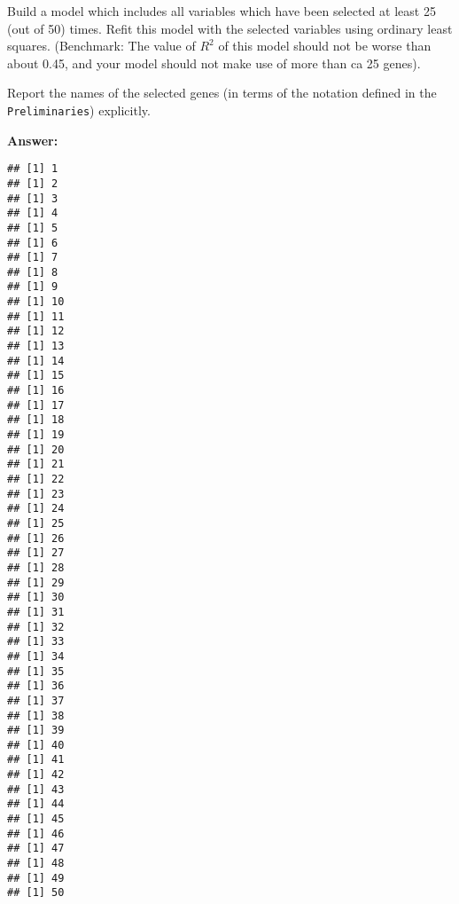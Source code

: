 \documentclass[
]{article}
\newenvironment{Shaded}{\begin{snugshade}}{\end{snugshade}}
\newcommand{\AttributeTok}[1]{\textcolor[rgb]{0.77,0.63,0.00}{#1}}
\newcommand{\CommentTok}[1]{\textcolor[rgb]{0.56,0.35,0.01}{\textit{#1}}}
\newcommand{\ControlFlowTok}[1]{\textcolor[rgb]{0.13,0.29,0.53}{\textbf{#1}}}
\newcommand{\DecValTok}[1]{\textcolor[rgb]{0.00,0.00,0.81}{#1}}
\newcommand{\FunctionTok}[1]{\textcolor[rgb]{0.00,0.00,0.00}{#1}}
\newcommand{\NormalTok}[1]{#1}
\newcommand{\OtherTok}[1]{\textcolor[rgb]{0.56,0.35,0.01}{#1}}
\newcommand{\SpecialCharTok}[1]{\textcolor[rgb]{0.00,0.00,0.00}{#1}}
\newcommand{\StringTok}[1]{\textcolor[rgb]{0.31,0.60,0.02}{#1}}
\begin{document}
Build a model which includes all variables which have been selected at
least 25 (out of 50) times. Refit this model with the selected variables
using ordinary least squares. (Benchmark: The value of \(R^2\) of this
model should not be worse than about 0.45, and your model should not
make use of more than ca 25 genes).

Report the names of the selected genes (in terms of the notation defined
in the \texttt{Preliminaries}) explicitly.

\textbf{Answer:}

\begin{Shaded}
\end{Shaded}

\begin{verbatim}
## [1] 1
## [1] 2
## [1] 3
## [1] 4
## [1] 5
## [1] 6
## [1] 7
## [1] 8
## [1] 9
## [1] 10
## [1] 11
## [1] 12
## [1] 13
## [1] 14
## [1] 15
## [1] 16
## [1] 17
## [1] 18
## [1] 19
## [1] 20
## [1] 21
## [1] 22
## [1] 23
## [1] 24
## [1] 25
## [1] 26
## [1] 27
## [1] 28
## [1] 29
## [1] 30
## [1] 31
## [1] 32
## [1] 33
## [1] 34
## [1] 35
## [1] 36
## [1] 37
## [1] 38
## [1] 39
## [1] 40
## [1] 41
## [1] 42
## [1] 43
## [1] 44
## [1] 45
## [1] 46
## [1] 47
## [1] 48
## [1] 49
## [1] 50
\end{verbatim}
\end{document}
